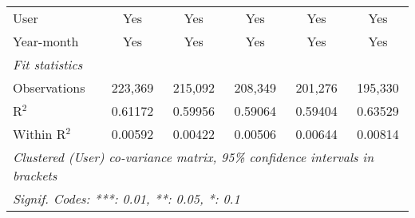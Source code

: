 \begin{table}[htbp]
\begin{threeparttable}[b]
\begin{tabular}{lccccc}
         User                         & Yes             & Yes            & Yes             & Yes             & Yes\\  
         Year-month                   & Yes             & Yes            & Yes             & Yes             & Yes\\  
         \midrule
         \emph{Fit statistics}\\
         Observations                 & 223,369         & 215,092        & 208,349         & 201,276         & 195,330\\  
         R$^2$                        & 0.61172         & 0.59956        & 0.59064         & 0.59404         & 0.63529\\  
         Within R$^2$                 & 0.00592         & 0.00422        & 0.00506         & 0.00644         & 0.00814\\  
         \midrule \midrule
         \multicolumn{6}{l}{\emph{Clustered (User) co-variance matrix, 95\% confidence intervals in brackets}}\\
         \multicolumn{6}{l}{\emph{Signif. Codes: ***: 0.01, **: 0.05, *: 0.1}}\\
      \end{tabular}
   \end{threeparttable}
\end{table}


